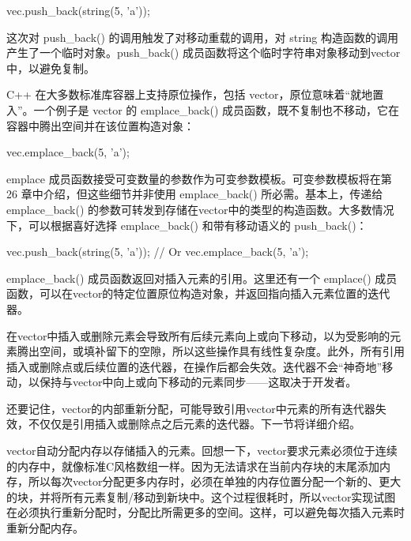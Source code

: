 \begin{cpp}
vec.push_back(string(5, 'a'));
\end{cpp}

这次对 push\_back() 的调用触发了对移动重载的调用，对 string 构造函数的调用产生了一个临时对象。push\_back() 成员函数将这个临时字符串对象移动到vector中，以避免复制。


C++ 在大多数标准库容器上支持原位操作，包括 vector，原位意味着“就地置入”。一个例子是 vector 的 emplace\_back() 成员函数，既不复制也不移动，它在容器中腾出空间并在该位置构造对象：

\begin{cpp}
vec.emplace_back(5, 'a');
\end{cpp}

emplace 成员函数接受可变数量的参数作为可变参数模板。可变参数模板将在第 26 章中介绍，但这些细节并非使用 emplace\_back() 所必需。基本上，传递给 emplace\_back() 的参数可转发到存储在vector中的类型的构造函数。大多数情况下，可以根据喜好选择 emplace\_back() 和带有移动语义的 push\_back()：

\begin{cpp}
vec.push_back(string(5, 'a'));
// Or
vec.emplace_back(5, 'a');
\end{cpp}

emplace\_back() 成员函数返回对插入元素的引用。这里还有一个 emplace() 成员函数，可以在vector的特定位置原位构造对象，并返回指向插入元素位置的迭代器。


在vector中插入或删除元素会导致所有后续元素向上或向下移动，以为受影响的元素腾出空间，或填补留下的空隙，所以这些操作具有线性复杂度。此外，所有引用插入或删除点或后续位置的迭代器，在操作后都会失效。迭代器不会“神奇地”移动，以保持与vector中向上或向下移动的元素同步——这取决于开发者。

还要记住，vector的内部重新分配，可能导致引用vector中元素的所有迭代器失效，不仅仅是引用插入或删除点之后元素的迭代器。下一节将详细介绍。


vector自动分配内存以存储插入的元素。回想一下，vector要求元素必须位于连续的内存中，就像标准C风格数组一样。因为无法请求在当前内存块的末尾添加内存，所以每次vector分配更多内存时，必须在单独的内存位置分配一个新的、更大的块，并将所有元素复制/移动到新块中。这个过程很耗时，所以vector实现试图在必须执行重新分配时，分配比所需更多的空间。这样，可以避免每次插入元素时重新分配内存。

